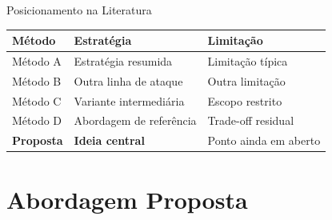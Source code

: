 \documentclass[aspectratio=169, 10pt, brazil]{beamer}
\begin{document}
\begin{frame}{Posicionamento na Literatura}
  \small\renewcommand{\arraystretch}{1.3}
  \begin{tabular}{@{}llp{3.5cm}@{}}
    \toprule
    \rowcolor{icompTealDark}
    \color{white}\textbf{Método} &
    \color{white}\textbf{Estratégia} &
    \color{white}\textbf{Limitação} \\
    \midrule
    Método A      & Estratégia resumida          & Limitação típica \\
    \rowcolor{icompCanvas}
    Método B      & Outra linha de ataque        & Outra limitação \\
    Método C      & Variante intermediária       & Escopo restrito \\
    \rowcolor{icompCanvas}
    Método D      & Abordagem de referência      & Trade-off residual \\
    \rowcolor{icompLimeSoft}
    \textbf{Proposta} & \textbf{Ideia central} &
      Ponto ainda em aberto \\
    \bottomrule
  \end{tabular}
\end{frame}

\section{Abordagem Proposta}
\end{document}
